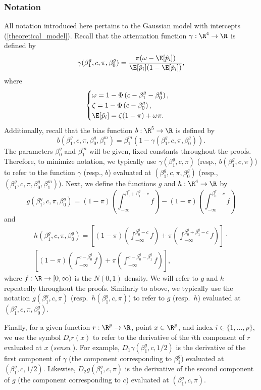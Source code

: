 \documentclass[12pt]{article}
\begin{document}
\subsubsection{Notation}
 All notation introduced here pertains to the Gaussian model with intercepts (\ref{theoretical_model}). Recall that the attenuation function $\gamma: \R^4 \to \R$ is defined by
$$ \gamma(\beta^g_1, c, \pi, \beta^g_0) = \frac{\pi(\omega - \E[\hat{p}_i])}{ \E[\hat{p}_i](1 -\E[\hat{p}_i])},$$ where $$\begin{cases}
\omega = 1 - \Phi\left(c - \beta_1^g - \beta_0^g \right) ,\\ \zeta = 1 - \Phi\left( c - \beta^g_0 \right), \\ \E[\hat{p}_i] = \zeta(1-\pi) + \omega\pi. 
\end{cases}$$ Additionally, recall that the bias function $b: \R^5 \to \R$ is defined by
$$ b(\beta^g_1, c, \pi, \beta^g_0, \beta^m_1) = \beta^m_1 (1 - \gamma(\beta^g_1, c, \pi, \beta^g_0)).$$ The parameters $\beta^g_0$ and $\beta^m_1$ will be given, fixed constants throughout the proofs. Therefore, to minimize notation, we typically use $\gamma(\beta^g_1, c, \pi)$ (resp., $b(\beta^g_1, c, \pi)$) to refer to the function $\gamma$ (resp., $b$) evaluated at $(\beta^g_1, c, \pi, \beta^g_0)$ (resp., $(\beta^g_1, c, \pi, \beta^g_0, \beta^m_1)$). Next, we define the functions $g$ and $h: \R^4 \to \R$ by
\begin{equation}\label{def_g}
g(\beta^g_1, c, \pi, \beta^g_0) = (1-\pi)\left( \int_{ -\infty}^{\beta_0^g + \beta_1^g - c} f \right) - (1-\pi)\left( \int_{-\infty}^{ \beta_0^g - c} f \right)\end{equation}
 and
\begin{multline}\label{def_h}
h(\beta^g_1, c, \pi, \beta^g_0) = \left[(1-\pi)\left( \int_{-\infty}^{ \beta_0^g - c} f \right) + \pi\left( \int_{-\infty}^{ \beta^g_0 + \beta^g_1 - c} f \right) \right] \cdot \\ \left[(1-\pi)\left( \int_{-\infty}^{c - \beta^g_0} f \right) + \pi\left(\int_{-\infty}^{c - \beta_0^g - \beta_1^g} f \right) \right],
\end{multline} where $f: \R \to [0,\infty)$ is the $N(0,1)$ density. We will refer to $g$ and $h$ repeatedly throughout the proofs. Similarly to above, we typically use the notation $g(\beta^g_1, c, \pi)$ (resp.\ $h(\beta^g_1, c, \pi)$) to refer to $g$ (resp.\ $h$) evaluated at $(\beta^g_1, c, \pi, \beta^g_0)$.

Finally, for a given function $r: \R^{p} \to \R$, point $x \in \R^p$, and index $i \in \{1, \dots, p\}$, we use the symbol $D_i r(x)$ to refer to the derivative of the $i$th component of $r$ evaluated at $x$ (\textit{sensu} \cite{fitzpatrick2009}). For example, $D_1 \gamma(\beta^g_1, c, 1/2)$ is the derivative of the first component of $\gamma$ (the component corresponding to $\beta^g_1$) evaluated at $(\beta^g_1, c, 1/2)$. Likewise,  $D_2g(\beta^g_1, c, \pi)$ is the derivative of the second component of $g$ (the component corresponding to $c$) evaluated at $(\beta^g_1, c, \pi).$
\end{document}
